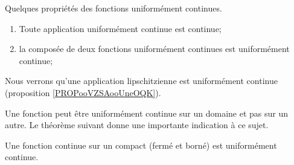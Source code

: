 \begin{proposition}
	Quelques propriétés des fonctions uniformément continues.
	\begin{enumerate}
		\item
			Toute application uniformément continue est continue;
		\item
			la composée de deux fonctions uniformément continues est uniformément continue;
	\end{enumerate}
\end{proposition}
Nous verrons qu'une application lipschitzienne est uniformément continue (proposition \ref{PROPooVZSAooUneOQK}).

Une fonction peut être uniformément continue sur un domaine et pas sur un autre. Le théorème suivant donne une importante indication à ce sujet.
\begin{theorem}[Heine]		\label{ThoHeineContinueCompact}
	Une fonction continue sur un compact (fermé et borné) est uniformément continue.
\end{theorem}

